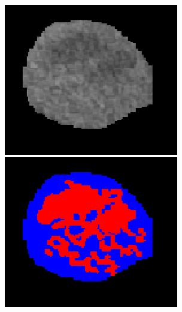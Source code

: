 \begin{figure}[!ht]
\begin{minipage}{4cm}
	\end{minipage} \\
	\begin{minipage}{4cm}
		\includegraphics[width=\linewidth]{images/NecrosisVE_Raw_Pat0_13_crop}
	\end{minipage} \hspace{-0.3cm}
	\begin{minipage}{4cm}
		\includegraphics[width=\linewidth]{images/NecrosisVE_GT_Pat0_13_crop}

\end{minipage}
\end{figure}
